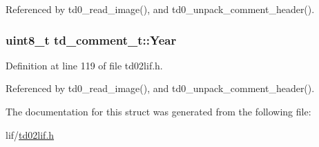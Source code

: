 Referenced by td0\+\_\+read\+\_\+image(), and td0\+\_\+unpack\+\_\+comment\+\_\+header().

\subsubsection[{\texorpdfstring{Year}{Year}}]{\setlength{\rightskip}{0pt plus 5cm}uint8\+\_\+t td\+\_\+comment\+\_\+t\+::\+Year}\hypertarget{structtd__comment__t_a0c804ec07303f411dd508dc64900aff5}{}\label{structtd__comment__t_a0c804ec07303f411dd508dc64900aff5}


Definition at line 119 of file td02lif.\+h.



Referenced by td0\+\_\+read\+\_\+image(), and td0\+\_\+unpack\+\_\+comment\+\_\+header().



The documentation for this struct was generated from the following file\+:\begin{DoxyCompactItemize}
\item 
lif/\hyperlink{td02lif_8h}{td02lif.\+h}\end{DoxyCompactItemize}
